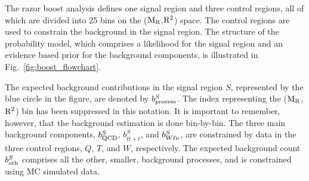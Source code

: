 

The razor boost analysis defines one signal region and three control regions, all of which are
divided into 25 bins on the ($\mathrm{M_R}$,$\mathrm{R^2}$) space. The control regions are used to constrain the
background in the signal region.
The structure of the probability model, which comprises a likelihood for the signal
region and an evidence based prior for the background components, is illustrated in
Fig.~\ref{fig:boost_flowchart}. 

The expected background contributions in the signal region $S$, represented by the blue circle in
the figure, are denoted by $b^S_{\rm process}$. The index representing the ($\mathrm{M_R}$,$\mathrm{R^2}$) bin has
been suppressed in this notation. It is important to remember, however, that the background
estimation is done bin-by-bin.  
The three main background components, $b^S_{\rm QCD}$, $b^S_{t\bar{t}+t}$, and $b^S_{W\ell\nu}$,
are constrained by data in the three control regions, $Q$, $T$, and $W$, respectively. 
The expected background count $b_{\rm oth}^S$ comprises all the other, smaller, background
processes, and is constrained using MC simulated data. 

